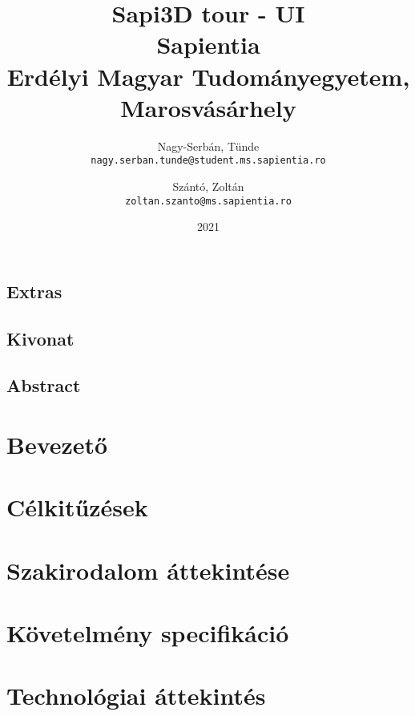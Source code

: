 \documentclass[12pt, twosides]{report}
\title{
	{Sapi3D tour - UI}\\
	{\large Sapientia\\
	Erdélyi Magyar Tudományegyetem, Marosvásárhely}
}
\author{
	Nagy-Serbán, Tünde\\
	\texttt{nagy.serban.tunde@student.ms.sapientia.ro}
	\and
	Szántó, Zoltán\\
	\texttt{zoltan.szanto@ms.sapientia.ro}	
}
\date{2021}
\begin{document}


\section*{Extras}

\pagebreak



\section*{Kivonat}

\pagebreak

\section*{Abstract}

\pagebreak


\tableofcontents

\listoffigures

\chapter{Bevezető}


\chapter{Célkitűzések}


\chapter{Szakirodalom áttekintése}


\chapter{Követelmény specifikáció}





\chapter{Technológiai áttekintés}


\end{document}
